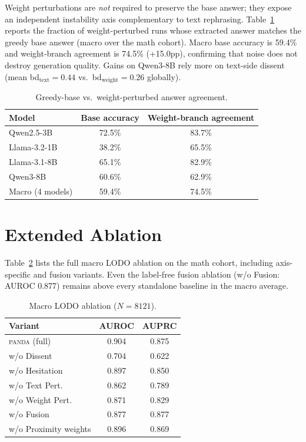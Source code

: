 \documentclass{article} %
\DeclareRobustCommand{\method}{%
  \texorpdfstring{%
    \ifmmode\text{\normalfont\textsc{panda}}\else\textsc{panda}\xspace\fi
  }{PANDA}%
}
\begin{document}
Weight perturbations are \emph{not} required to preserve the base answer; they expose an independent instability axis complementary to text rephrasing.
Table~\ref{tab:app-weight-acc} reports the fraction of weight-perturbed runs whose extracted answer matches the greedy base answer (macro over the math cohort).
Macro base accuracy is 59.4\% and weight-branch agreement is 74.5\% (+15.0pp), confirming that noise does not destroy generation quality.
Gains on Qwen3-8B rely more on text-side dissent (mean bd$_{\text{text}}{=}0.44$ vs.\ bd$_{\text{weight}}{=}0.26$ globally).

\begin{table}[t]
  \centering
  \small
  \caption{Greedy-base vs.\ weight-perturbed answer agreement.}
  \label{tab:app-weight-acc}
  \begin{tabular}{lcc}
    \toprule
    Model & Base accuracy & Weight-branch agreement \\
    \midrule
    Qwen2.5-3B  & 72.5\% & 83.7\% \\
    Llama-3.2-1B & 38.2\% & 65.5\% \\
    Llama-3.1-8B & 65.1\% & 82.9\% \\
    Qwen3-8B    & 60.6\% & 62.9\% \\
    \midrule
    Macro (4 models) & 59.4\% & 74.5\% \\
    \bottomrule
  \end{tabular}
\end{table}


\section{Extended Ablation}
\label{app:ablation-ext}

Table~\ref{tab:app-ablation} lists the full macro LODO ablation on the math cohort, including axis-specific and fusion variants.
Even the label-free fusion ablation (w/o Fusion: AUROC 0.877) remains above every standalone baseline in the macro average.

\begin{table}[t]
  \centering
  \small
  \caption{Macro LODO ablation ($N{=}8121$).}
  \label{tab:app-ablation}
  \begin{tabular}{lcc}
    \toprule
    Variant & AUROC & AUPRC \\
    \midrule
    \method{} (full)      & 0.904 & 0.875 \\
    w/o Dissent           & 0.704 & 0.622 \\
    w/o Hesitation        & 0.897 & 0.850 \\
    w/o Text Pert.        & 0.862 & 0.789 \\
    w/o Weight Pert.      & 0.871 & 0.829 \\
    w/o Fusion            & 0.877 & 0.877 \\
    w/o Proximity weights & 0.896 & 0.869 \\
    \bottomrule
  \end{tabular}
\end{table}
\end{document}
